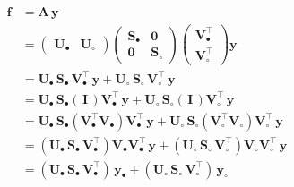 \documentclass[modern]{aastex62}
\begin{document}
\begin{align}
    \label{eq:ydecomp}
    \mathbf{f} & = \mathbf{A} \, \mathbf{y}
    \nonumber                               \\
               & =
    \left(
    \begin{array}{c|c}
            \mathbf{U}_\bullet & \mathbf{U}_\circ
        \end{array}
    \right)
    \left(
    \begin{array}{c|c}
            \mathbf{S}_\bullet & \mathbf{0}       \\
            \hline
            \mathbf{0}         & \mathbf{S}_\circ
        \end{array}
    \right)
    \left(
    \begin{array}{cc}
            \mathbf{V}_\bullet^\top \\
            \hline
            \mathbf{V}_\circ^\top
        \end{array}
    \right) \mathbf{y}
    \nonumber                               \\[0.5em]
               & =
    \mathbf{U}_\bullet \, \mathbf{S}_\bullet \, \mathbf{V}_\bullet^\top \, \mathbf{y}
    +
    \mathbf{U}_\circ \, \mathbf{S}_\circ \, \mathbf{V}_\circ^\top \, \mathbf{y}
    \nonumber                               \\[0.5em]
               & =
    \mathbf{U}_\bullet \, \mathbf{S}_\bullet (\,\mathbf{I}\,) \mathbf{V}_\bullet^\top \, \mathbf{y}
    +
    \mathbf{U}_\circ \, \mathbf{S}_\circ (\,\mathbf{I}\,) \mathbf{V}_\circ^\top \, \mathbf{y}
    \nonumber                               \\[0.5em]
               & =
    \mathbf{U}_\bullet \, \mathbf{S}_\bullet (\mathbf{V}_\bullet^\top \mathbf{V}_\bullet) \mathbf{V}_\bullet^\top \, \mathbf{y}
    +
    \mathbf{U}_\circ \, \mathbf{S}_\circ (\mathbf{V}_\circ^\top \mathbf{V}_\circ) \mathbf{V}_\circ^\top \, \mathbf{y}
    \nonumber                               \\[0.5em]
               & =
    (\mathbf{U}_\bullet \, \mathbf{S}_\bullet \, \mathbf{V}_\bullet^\top) \mathbf{V}_\bullet \mathbf{V}_\bullet^\top \, \mathbf{y}
    +
    (\mathbf{U}_\circ \, \mathbf{S}_\circ \, \mathbf{V}_\circ^\top) \mathbf{V}_\circ \mathbf{V}_\circ^\top \, \mathbf{y}
    \nonumber                               \\[0.5em]
               & =
    (\mathbf{U}_\bullet \, \mathbf{S}_\bullet \, \mathbf{V}_\bullet^\top) \, \mathbf{y}_\bullet
    +
    (\mathbf{U}_\circ \, \mathbf{S}_\circ \, \mathbf{V}_\circ^\top) \, \mathbf{y}_\circ
\end{align}
\end{document}
